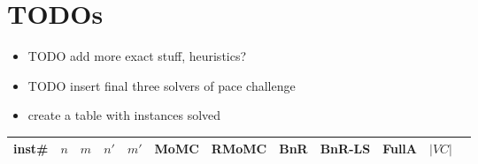 \documentclass[twoside,leqno,twocolumn]{article}
\begin{document}
\section{TODOs}
\begin{itemize}
        \item TODO add more exact stuff, heuristics?
\item TODO insert final three solvers of pace challenge
\item create a table with instances solved
\end{itemize}
\begin{table*}
\centering
\begin{tabular}{l@{\hskip 25pt} rrrr|ccccc|rc}
\toprule
inst\# & $n$ &$m$& $n'$& $m'$ & MoMC & RMoMC & BnR & BnR-LS & FullA & $|VC|$ \\
                \midrule


\end{tabular}
\end{table*}
\end{document}
